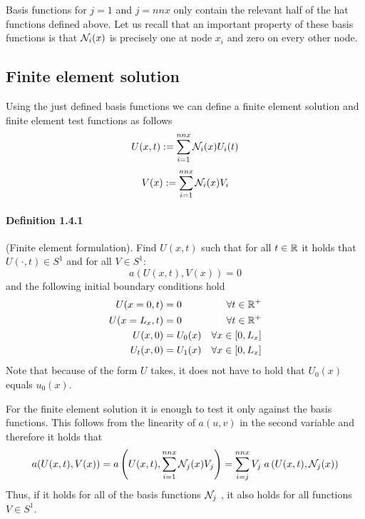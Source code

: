 Basis functions for $j=1$ and $j=nnx$ only contain the relevant half of the hat functions defined above.
Let us recall that an important property of these basis functions is that ${\mathcal{N}}_i(x)$ is precisely one 
at node $x_i$ and zero on every other node.

\subsection{Finite element solution}

Using the just defined basis functions we can define a finite element solution and finite element test functions as follows
\[
U(x,t) := \sum_{i=1}^{nnx} {\mathcal{N}}_i(x)  U_i(t)
\]
\[
V(x) := \sum_{i=1}^{nnx} {\mathcal{N}}_i(x)  V_i
\]

\paragraph{Definition 1.4.1} (Finite element formulation). 
Find $U(x,t)$ such that for all $t\in {\mathbb{R}}$ it holds that $U(\cdot,t)\in S^1$
and for all $V \in S^1$:
\[
a(U(x,t),V(x))=0
\]
and the following initial boundary conditions hold
\begin{align}
U(x=0,t) & = 0 & \forall t\in {\mathbb{R}}^+  \nonumber\\
U(x=L_x,t) & = 0 & \forall t\in {\mathbb{R}}^+ \nonumber\\
U(x,0) &= U_0(x) & \forall x\in[0,L_x] \nonumber\\
U_t(x,0) &= U_1(x) & \forall x\in[0,L_x] \label{eq:fdm-wave-4}
\end{align}
Note that because of the form $U$ takes, it does not have to hold that $U_0(x)$ equals $u_0(x)$.

For the finite element solution it is enough to test it only against the basis functions. This follows from the linearity of $a(u,v)$ in the second variable and therefore it holds that
\[
a(U(x,t),V(x))
=a\left(U(x,t), \sum_{i=1}^{nnx} {\mathcal{N}}_j(x) V_j \right) 
=\sum_{i=j}^{nnx} V_j \; a\left(U(x,t),  {\mathcal{N}}_j(x) \right) 
\]
Thus, if it holds for all of the basis functions ${\mathcal{N}}_j$ , it also holds for all functions 
$V \in S^1$.

